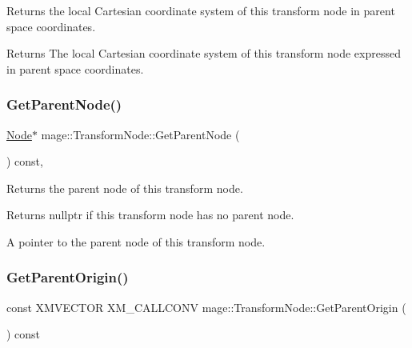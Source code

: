 Returns the local Cartesian coordinate system of this transform node in parent space coordinates.

\begin{DoxyReturn}{Returns}
The local Cartesian coordinate system of this transform node expressed in parent space coordinates. 
\end{DoxyReturn}
\hypertarget{classmage_1_1_transform_node_a63ed2249e0629f0874da5095c0deb705}{}\label{classmage_1_1_transform_node_a63ed2249e0629f0874da5095c0deb705} 
\subsubsection{\texorpdfstring{Get\+Parent\+Node()}{GetParentNode()}}
{\footnotesize\ttfamily \hyperlink{classmage_1_1_node}{Node}$\ast$ mage\+::\+Transform\+Node\+::\+Get\+Parent\+Node (\begin{DoxyParamCaption}{ }\end{DoxyParamCaption}) const\hspace{0.3cm}{\ttfamily [private]}, {\ttfamily [noexcept]}}

Returns the parent node of this transform node.

\begin{DoxyReturn}{Returns}
{\ttfamily nullptr} if this transform node has no parent node. 

A pointer to the parent node of this transform node. 
\end{DoxyReturn}
\hypertarget{classmage_1_1_transform_node_a8d440742d586070e38ba650d4744f149}{}\label{classmage_1_1_transform_node_a8d440742d586070e38ba650d4744f149} 
\subsubsection{\texorpdfstring{Get\+Parent\+Origin()}{GetParentOrigin()}}
{\footnotesize\ttfamily const X\+M\+V\+E\+C\+T\+OR X\+M\+\_\+\+C\+A\+L\+L\+C\+O\+NV mage\+::\+Transform\+Node\+::\+Get\+Parent\+Origin (\begin{DoxyParamCaption}{ }\end{DoxyParamCaption}) const\hspace{0.3cm}{\ttfamily [noexcept]}}

